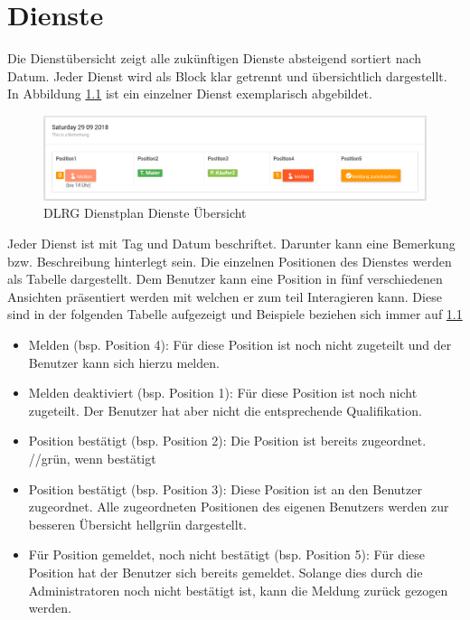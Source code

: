 \chapter{Dienste}
\label{cha:dienste}
Die Dienstübersicht zeigt alle zukünftigen Dienste absteigend sortiert nach Datum. Jeder Dienst wird als Block klar getrennt und übersichtlich dargestellt. In Abbildung \ref{fig:view_service} \textit{} ist ein einzelner Dienst exemplarisch abgebildet.

\begin{figure}[h]
 \begin{addmargin}{-0.2\linewidth}
   \centering 
   \includegraphics[width=20cm]{Bilder/view_service.png}
 \end{addmargin} 
 \caption[Dienste Übersicht]{DLRG Dienstplan Dienste Übersicht}
 \label{fig:view_service}
\end{figure}

\noindent Jeder Dienst ist mit Tag und Datum beschriftet. Darunter kann eine Bemerkung bzw. Beschreibung hinterlegt sein. Die einzelnen Positionen des Dienstes werden als Tabelle dargestellt.
\noindent Dem Benutzer kann eine Position in fünf verschiedenen Ansichten präsentiert werden mit welchen er zum teil Interagieren kann.
Diese sind in der folgenden Tabelle aufgezeigt und Beispiele beziehen sich immer auf \ref{fig:view_service} \textit{}

\begin{itemize}
\item Melden (bsp. Position 4): Für diese Position ist noch nicht zugeteilt und der Benutzer kann sich hierzu melden.
\item Melden deaktiviert (bsp. Position 1): Für diese Position ist noch nicht zugeteilt. Der Benutzer hat aber nicht die entsprechende Qualifikation.
\item Position bestätigt (bsp. Position 2): Die Position ist bereits zugeordnet. //grün, wenn bestätigt
\item Position bestätigt (bsp. Position 3): Diese Position ist an den Benutzer zugeordnet. Alle zugeordneten Positionen des eigenen Benutzers werden zur besseren Übersicht hellgrün dargestellt.
\item Für Position gemeldet, noch nicht bestätigt (bsp. Position 5): Für diese Position hat der Benutzer sich bereits gemeldet. Solange dies durch die Administratoren noch nicht bestätigt ist, kann die Meldung zurück gezogen werden.
\end{itemize}

